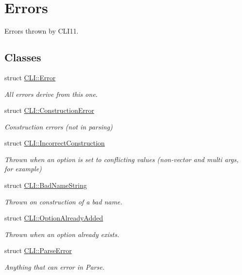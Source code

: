 \hypertarget{group__error__group}{}\section{Errors}
\label{group__error__group}


Errors thrown by C\+L\+I11.  


\subsection*{Classes}
\begin{DoxyCompactItemize}
\item 
struct \mbox{\hyperlink{struct_c_l_i_1_1_error}{C\+L\+I\+::\+Error}}
\begin{DoxyCompactList}\small\item\em All errors derive from this one. \end{DoxyCompactList}\item 
struct \mbox{\hyperlink{struct_c_l_i_1_1_construction_error}{C\+L\+I\+::\+Construction\+Error}}
\begin{DoxyCompactList}\small\item\em Construction errors (not in parsing) \end{DoxyCompactList}\item 
struct \mbox{\hyperlink{struct_c_l_i_1_1_incorrect_construction}{C\+L\+I\+::\+Incorrect\+Construction}}
\begin{DoxyCompactList}\small\item\em Thrown when an option is set to conflicting values (non-\/vector and multi args, for example) \end{DoxyCompactList}\item 
struct \mbox{\hyperlink{struct_c_l_i_1_1_bad_name_string}{C\+L\+I\+::\+Bad\+Name\+String}}
\begin{DoxyCompactList}\small\item\em Thrown on construction of a bad name. \end{DoxyCompactList}\item 
struct \mbox{\hyperlink{struct_c_l_i_1_1_option_already_added}{C\+L\+I\+::\+Option\+Already\+Added}}
\begin{DoxyCompactList}\small\item\em Thrown when an option already exists. \end{DoxyCompactList}\item 
struct \mbox{\hyperlink{struct_c_l_i_1_1_parse_error}{C\+L\+I\+::\+Parse\+Error}}
\begin{DoxyCompactList}\small\item\em Anything that can error in Parse. \end{DoxyCompactList}\item 

\end{DoxyCompactItemize}
